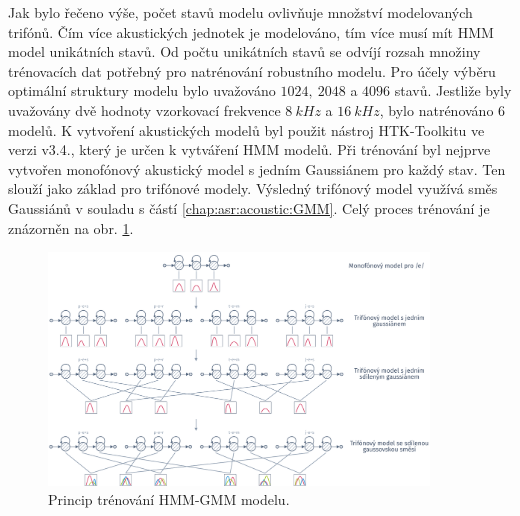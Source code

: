 Jak bylo řečeno výše, počet stavů modelu ovlivňuje množství modelovaných trifónů.
Čím více akustických jednotek je modelováno, tím více musí mít HMM model unikátních stavů.
Od počtu unikátních stavů se odvíjí rozsah množiny trénovacích dat potřebný pro  natrénování robustního modelu.
Pro účely výběru optimální struktury modelu bylo uvažováno $1024,\ 2048$ a $4096$ stavů.
Jestliže byly uvažovány dvě hodnoty vzorkovací frekvence $8\ kHz$ a $16\ kHz$, bylo natrénováno $6$ modelů.
K vytvoření akustických modelů byl použit nástroj HTK-Toolkitu ve verzi v3.4., který je určen k vytváření HMM modelů.
Při trénování byl nejprve vytvořen monofónový akustický model s jedním Gaussiánem pro každý stav.
Ten slouží jako základ pro trifónové modely.
Výsledný trifónový model využívá směs Gaussiánů v souladu s částí \ref{chap:asr:acoustic:GMM}.
Celý proces trénování je znázorněn na obr. \ref{fig:construction:results:baseline:hmm:training}.

\begin{figure}[hbpt]
  \centering
  \includegraphics[width=0.9\textwidth]{./ch5-construction/img/hmm-training.pdf}
  \caption{Princip trénování HMM-GMM modelu.}
  \label{fig:construction:results:baseline:hmm:training}
\end{figure}

